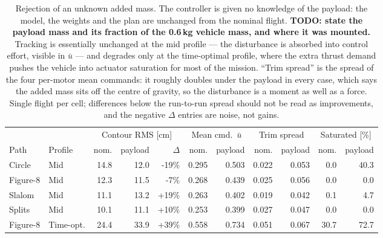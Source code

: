 \begin{table}[t]
\centering
\caption{Rejection of an unknown added mass. The controller is given no
knowledge of the payload: the model, the weights and the plan are unchanged
from the nominal flight. \textbf{TODO: state the payload mass and its
fraction of the 0.6\,kg vehicle mass, and where it was mounted.}
Tracking is essentially unchanged at the mid profile --- the disturbance is
absorbed into control effort, visible in $\bar{u}$ --- and degrades only at
the time-optimal profile, where the extra thrust demand pushes the vehicle
into actuator saturation for most of the mission. ``Trim spread'' is the
spread of the four per-motor mean commands: it roughly doubles under the
payload in every case, which says the added mass sits off the centre of
gravity, so the disturbance is a moment as well as a force. Single flight per
cell; differences below the run-to-run spread should not be read as
improvements, and the negative $\Delta$ entries are noise, not gains.}
\label{tab:payload}
\begin{tabular}{llrrrrrrrrr}
\toprule
& & \multicolumn{3}{c}{Contour RMS [cm]} & \multicolumn{2}{c}{Mean cmd.\ $\bar{u}$}
  & \multicolumn{2}{c}{Trim spread} & \multicolumn{2}{c}{Saturated [\%]} \\
\cmidrule(lr){3-5}\cmidrule(lr){6-7}\cmidrule(lr){8-9}\cmidrule(lr){10-11}
Path & Profile & nom. & payload & $\Delta$ & nom. & payload & nom. & payload
 & nom. & payload \\
\midrule
Circle & Mid & 14.8 & 12.0 & -19\% & 0.295 & 0.503 & 0.022 & 0.053 & 0.0 & 40.3 \\
Figure-8 & Mid & 12.3 & 11.5 & -7\% & 0.268 & 0.439 & 0.025 & 0.056 & 0.0 & 0.0 \\
Slalom & Mid & 11.1 & 13.2 & +19\% & 0.263 & 0.402 & 0.019 & 0.042 & 0.1 & 4.7 \\
Splits & Mid & 10.1 & 11.1 & +10\% & 0.253 & 0.399 & 0.027 & 0.047 & 0.0 & 0.0 \\
Figure-8 & Time-opt. & 24.4 & 33.9 & +39\% & 0.558 & 0.734 & 0.051 & 0.067 & 30.7 & 72.7 \\
\bottomrule
\end{tabular}
\end{table}
